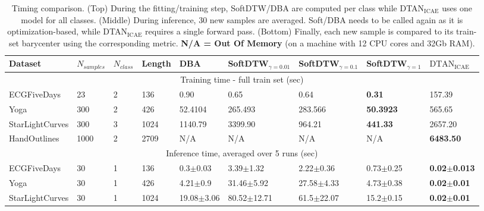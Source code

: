 \begin{table*}[t]
\centering
\caption{Timing comparison. (Top) During the fitting/training step, SoftDTW/DBA are computed per class while DTAN$_{\mathrm{ICAE}}$ uses one model for all classes. (Middle) During inference, 30 new samples are averaged. Soft/DBA needs to be called again as it is optimization-based, while DTAN$_{\mathrm{ICAE}}$ requires a single forward pass. (Bottom) Finally, each new sample is compared to its train-set barycenter using the corresponding metric. \textbf{N/A = Out Of Memory} (on a machine with 12 CPU cores and 32Gb RAM).} 
\label{tab:timing}
\footnotesize
\begin{tabular}{lllllllll}
\toprule
Dataset         & $N_{samples}$ & $N_{class}$ & Length & DBA             & SoftDTW$_{\gamma=0.01}$     & SoftDTW$_{\gamma=0.1}$   & SoftDTW$_{\gamma=1}$         & $\mathrm{DTAN_{ICAE}}$
\\ \midrule
\multicolumn{9}{c}{Training time - full train set  (sec)}                                                                                              \\ \midrule
ECGFiveDays     & 23            & 2           & 136    & 0.90            & 0.65            & 0.64             & \textbf{0.31}           & 157.39          \\
Yoga            & 300           & 2           & 426    & 52.4104         & 265.493         & 283.566          & \textbf{50.3923}        & 565.65          \\
StarLightCurves & 300           & 3           & 1024   & 1140.79         & 3399.90         & 964.21           & \textbf{441.33}         & 2657.20         \\
HandOutlines    & 1000          & 2           & 2709   & N/A             & N/A             & N/A                 & N/A          & \textbf{6483.50}         \\ \midrule
\multicolumn{9}{c}{Inference time, averaged over 5 runs (sec)}                                                                       \\\midrule 
ECGFiveDays     & 30            & 1           & 136    & 0.3$\pm$0.03    & 3.39$\pm$1.32   & 2.22$\pm$0.36    & 0.73$\pm$0.25  & \textbf{0.02$\pm$0.013} \\
Yoga            & 30            & 1           & 426    & 4.21$\pm$0.9    & 31.46$\pm$5.92  & 27.58$\pm$4.33   & 4.73$\pm$0.38  & \textbf{0.02$\pm$0.01}   \\
StarLightCurves & 30            & 1           & 1024   & 19.08$\pm$3.06  & 80.52$\pm$12.71 & 61.5$\pm$22.07   & 15.2$\pm$0.15  & \textbf{0.02$\pm$0.01}   \\

\end{tabular}
\end{table*}
